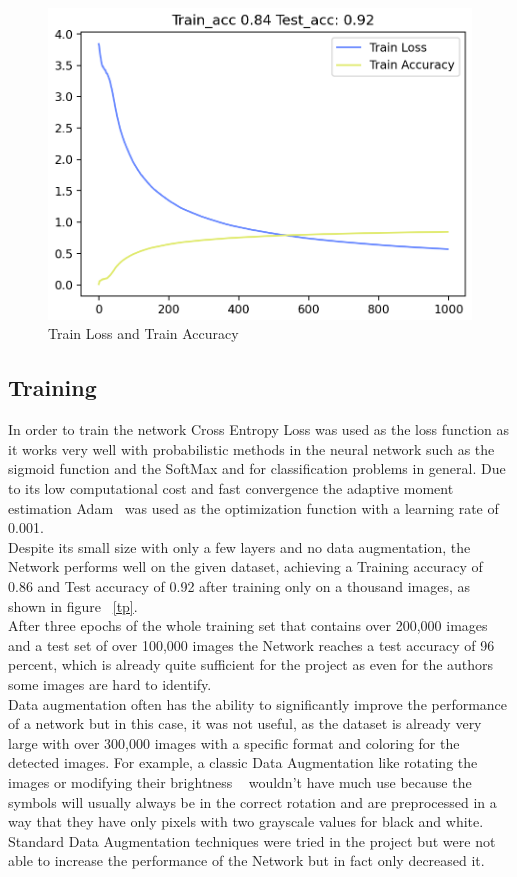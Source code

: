 \documentclass[@CLASSOPTIONS@]{tumarticle}
\begin{document}
\begin{figure}
    \begin{minipage}{0.48\textwidth}
     \centering
     \includegraphics[width=.9\linewidth]{figures/train_plot}
     \caption{Train Loss and Train Accuracy}\label{Fig:tp}
   \end{minipage}
\end{figure}

\subsection{Training}

In order to train the network Cross Entropy Loss was used as the loss function as it works very well with probabilistic
methods in the neural network such as the sigmoid function and the SoftMax and for classification problems in general.
Due to its low computational cost and fast convergence the adaptive moment estimation Adam~\cite{Adam} was used as the optimization
function with a learning rate of 0.001.\\
Despite its small size with only a few layers and no data augmentation, the Network performs well on the given dataset,
achieving a Training accuracy of 0.86 and Test accuracy of 0.92 after training only on a thousand images, as shown in
figure ~\ref{tp}.\\
After three epochs of the whole training set that contains over 200,000 images and a test set of over 100,000 images the
Network reaches a test accuracy of 96 percent, which is already quite sufficient for the project as even for the authors
some images are hard to identify.\\
Data augmentation often has the ability to significantly improve the performance of a network but in this case, it
was not useful, as the dataset is already very large with over 300,000 images with a specific format and coloring for
the detected images.
For example, a classic Data Augmentation like rotating the images or modifying their brightness ~\cite{DataAugm}
wouldn’t have much use because the symbols will usually always be in the correct rotation and are preprocessed in a
way that they have only pixels with two grayscale values for black and white.
Standard Data Augmentation techniques were tried in the project but were not able to increase the performance of the
Network but in fact only decreased it.
\end{document}
